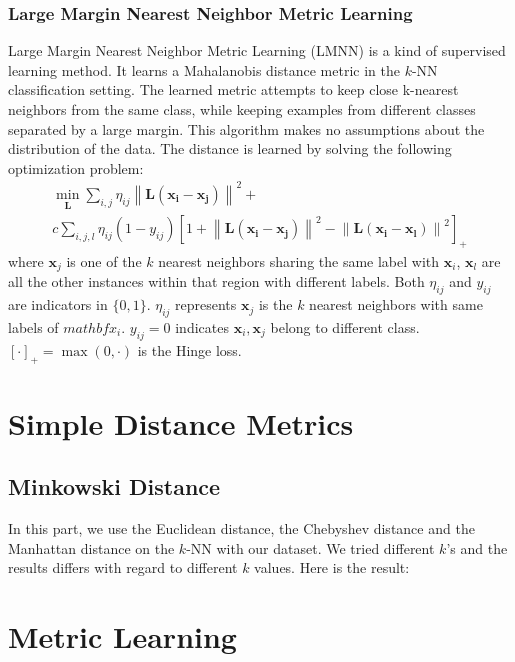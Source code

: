\documentclass[conference]{IEEEtran}
\begin{document}
\subsubsection{Large Margin Nearest Neighbor Metric Learning}
\par
Large Margin Nearest Neighbor Metric Learning (LMNN) \cite{weinberger2009distance} is a kind of supervised learning method. It learns a Mahalanobis distance metric in the $k$-NN classification setting. 
The learned metric attempts to keep close k-nearest neighbors from the same class, while keeping examples from different classes separated by a large margin. This algorithm makes no assumptions about the distribution of the data.
The distance is learned by solving the following optimization problem:
\begin{equation}
	\begin{array}{l}
		\min _{\mathbf{L}} \sum_{i, j} \eta_{i j}\left\|\mathbf{L}\left(\mathbf{x}_{\mathbf{i}}-\mathbf{x}_{\mathbf{j}}\right)\right\|^{2}+\\
		c \sum_{i, j, l} \eta_{i j}\left(1-y_{i j}\right)\left[1+\left\|\mathbf{L}\left(\mathbf{x}_{\mathbf{i}}-\mathbf{x}_{\mathbf{j}}\right)\right\|^{2}-\left\|\mathbf{L}\left(\mathbf{x}_{\mathbf{i}}-\mathbf{x}_{\mathbf{l}}\right)\right\|^{2}\right]_{+}	
	\end{array}
\end{equation}
where $\mathbf{x}_j$ is one of the $k$ nearest neighbors sharing the same label with $\mathbf{x}_i$, $\mathbf{x}_l$ are all the other instances within that region with different labels. Both $\eta_{ij}$ and $y_{ij}$ are indicators in $\{0,1\}$. $\eta_{ij}$ represents $\mathbf{x}_j$ is the $k$ nearest neighbors with same labels of $mathbf{x}_i$.
$y_{ij}=0$ indicates $\mathbf{x}_i,\mathbf{x}_j$ belong to different class. $[\cdot]_+=\max(0,\cdot)$ is the Hinge loss.
\section{Simple Distance Metrics}
\subsection{Minkowski Distance}
In this part, we use the Euclidean distance, the Chebyshev distance and the Manhattan distance on the $k$-NN with our dataset. We tried different $k$'s and the results differs with regard to different $k$ values. Here is the result:

\section{Metric Learning}
\end{document}
